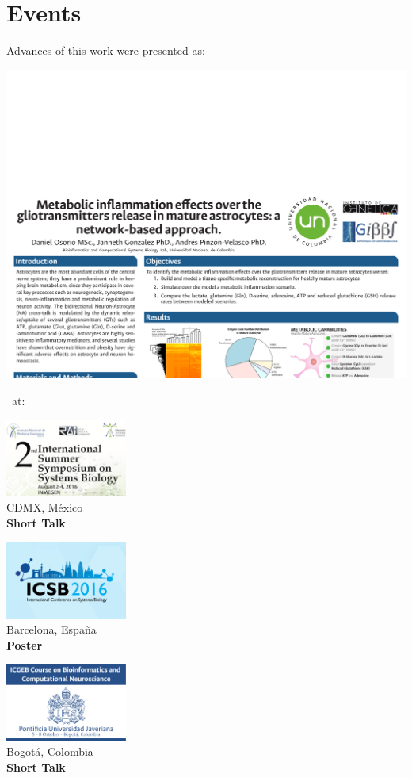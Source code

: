 \documentclass[11pt]{beamer}
\begin{document}
\section{Events}
\begin{frame}{Advances of this work were presented as:}
\begin{center}
\includegraphics[width=\textwidth]{Events}
\end{center}
\hrulefill \ at: \hrulefill
\begin{multicols}{3}
\begin{center}
\includegraphics[width=0.3\textwidth]{IS3B}\\
CDMX, México\\
\textbf{Short Talk}
\end{center}
\begin{center}
\includegraphics[width=0.3\textwidth]{ICSB}\\
Barcelona, España\\
\textbf{Poster}
\end{center}
\begin{center}
\includegraphics[width=0.3\textwidth]{ICGEB}\\
Bogotá, Colombia\\
\textbf{Short Talk}
\end{center}
\end{multicols}
\end{frame}
\end{document}
